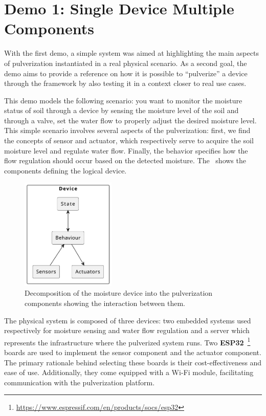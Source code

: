 \section{Demo 1: Single Device Multiple Components}
\label{sec:demo-1}

With the first demo, a simple system was aimed at highlighting the main aspects of pulverization instantiated in a real physical scenario.
As a second goal, the demo aims to provide a reference on how it is possible to ``pulverize'' a device through the framework by also testing it in a
context closer to real use cases.

This demo models the following scenario: you want to monitor the moisture status of soil through a device
by sensing the moisture level of the soil and through a valve, set the water flow to properly adjust the desired moisture level.
This simple scenario involves several aspects of the pulverization: first, we find the concepts of sensor and actuator, which respectively serve to
acquire the soil moisture level and regulate water flow. Finally, the behavior specifies how the flow regulation should occur based on
the detected moisture. The~ shows the components defining the logical device.

\begin{figure}[ht]
	\centering
	\includegraphics[width=0.4\textwidth]{figures/demo1-device.pdf}
	\caption[Moisture device decomposition into pulverization components]{Decomposition of the moisture device into the pulverization components showing the interaction between them.}
	\label{fig:demo-1-system}
\end{figure}

The physical system is composed of three devices: two embedded systems used respectively for moisture sensing and water flow regulation and a server
which represents the infrastructure where the pulverized system runs.
Two \textbf{ESP32}~\footnote{\url{https://www.espressif.com/en/products/socs/esp32}} boards are used to implement the sensor component and the
actuator component. The primary rationale behind selecting these boards is their cost-effectiveness and ease of use. Additionally, they come equipped
with a Wi-Fi module, facilitating communication with the pulverization platform.

